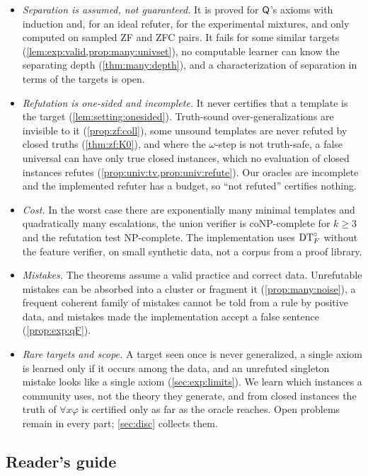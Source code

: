 \begin{itemize}
\item \emph{Separation is assumed, not guaranteed.} It is proved for $\mathsf{Q}$'s axioms with induction and, for an ideal
  refuter, for the experimental mixtures, and only computed on sampled ZF and ZFC pairs. It fails for some similar
  targets (\cref{lem:exp:valid,prop:many:univset}), no computable learner can know the separating depth
  (\cref{thm:many:depth}), and a characterization of separation in terms of the targets is open.
\item \emph{Refutation is one-sided and incomplete.} It never certifies that a template is the target
  (\cref{lem:setting:onesided}). Truth-sound over-generalizations are invisible to it (\cref{prop:zf:coll}), some
  unsound templates are never refuted by closed truths (\cref{thm:zf:K0}), and where the $\omega$-step is not
  truth-safe, a false universal can have only true closed instances, which no evaluation of closed instances refutes
  (\cref{prop:univ:tv,prop:univ:refute}). Our oracles are incomplete and the implemented refuter has a budget, so ``not
  refuted'' certifies nothing.
\item \emph{Cost.} In the worst case there are exponentially many minimal templates and quadratically many escalations,
  the union verifier is coNP-complete for $k\ge3$ and the refutation test NP-complete. The implementation uses $\mathrm{DT}^{\circ}_{F}$
  without the feature verifier, on small synthetic data, not a corpus from a proof library.
\item \emph{Mistakes.} The theorems assume a valid practice and correct data. Unrefutable mistakes can be absorbed into
  a cluster or fragment it (\cref{prop:many:noise}), a frequent coherent family of mistakes cannot be told from a rule
  by positive data, and mistakes made the implementation accept a false sentence (\cref{prop:exp:qF}).
\item \emph{Rare targets and scope.} A target seen once is never generalized, a single axiom is learned only if it
  occurs among the data, and an unrefuted singleton mistake looks like a single axiom (\cref{sec:exp:limits}). We learn
  which instances a community uses, not the theory they generate, and from closed instances the truth of $\forall
  x\varphi$ is certified only as far as the oracle reaches. Open problems remain in every part; \cref{sec:disc} collects
  them.
\end{itemize}

\subsection{Reader's guide}\label{sec:intro:guide}

